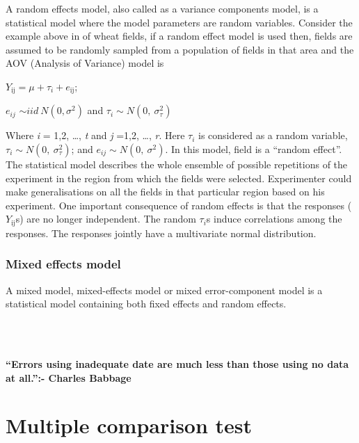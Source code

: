 \documentclass[
]{book}
\begin{document}
A random effects model, also called as a variance components model, is a
statistical model where the model parameters are random variables.
Consider the example above in of wheat fields, if a random effect model
is used then, fields are assumed to be randomly sampled from a
population of fields in that area and the AOV (Analysis of Variance)
model is

\(Y_{\text{ij}} = \mu + \tau_{i} + e_{\text{ij}}\);

\(e_{ij}\) \(\sim iid\ N(0,\sigma^{2})\) and \(\tau_{i}\sim N(0,\ \sigma_{\tau}^{2})\)

Where \emph{i} = 1,2, \ldots, \emph{t} and \emph{j} =1,2, \ldots, \emph{r}. Here \(\tau_{i}\) is
considered as a random variable,
\(\tau_{i}\sim N(0,\ \sigma_{\tau}^{2})\); and
\(e_{ij}\sim N(0,\ \sigma^{2})\). In this model, field is a ``random
effect''. The statistical model describes the whole ensemble of possible
repetitions of the experiment in the region from which the fields were
selected. Experimenter could make generalisations on all the fields in
that particular region based on his experiment. One important
consequence of random effects is that the responses (\(Y_{\text{ij}}\)\textquotesingle s)
are no longer independent. The random \(\tau_{i}\)\textquotesingle s induce correlations
among the responses. The responses jointly have a multivariate normal
distribution.

\hypertarget{mixed-effects-model}{%
\subsection{Mixed effects model}\label{mixed-effects-model}}

A mixed model, mixed-effects model or mixed error-component model is a
statistical model containing both fixed effects and random effects.

~\\
\hspace*{0.333em}\\
\hspace*{0.333em}

\hypertarget{hello}{}
\textbf{``Errors using inadequate date are much less than those using no data at all.'':- Charles Babbage }

\hypertarget{multiple-comparison-test}{%
\chapter{Multiple comparison test}\label{multiple-comparison-test}}
\end{document}

